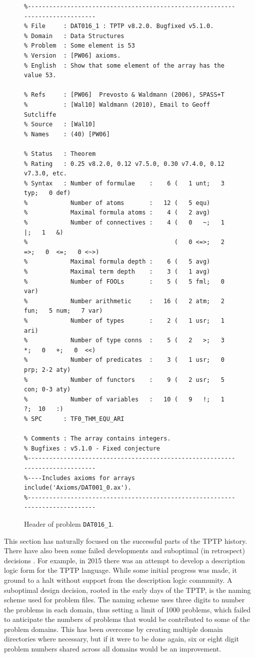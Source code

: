\documentclass{easychair}
\begin{document}
\begin{figure}[htb]
{\footnotesize
{\setlength{\baselineskip}{3mm}
\begin{verbatim}
%------------------------------------------------------------------------------
% File     : DAT016_1 : TPTP v8.2.0. Bugfixed v5.1.0.
% Domain   : Data Structures
% Problem  : Some element is 53
% Version  : [PW06] axioms.
% English  : Show that some element of the array has the value 53.

% Refs     : [PW06]  Prevosto & Waldmann (2006), SPASS+T
%          : [Wal10] Waldmann (2010), Email to Geoff Sutcliffe
% Source   : [Wal10]
% Names    : (40) [PW06]

% Status   : Theorem
% Rating   : 0.25 v8.2.0, 0.12 v7.5.0, 0.30 v7.4.0, 0.12 v7.3.0, etc.
% Syntax   : Number of formulae    :    6 (   1 unt;   3 typ;   0 def)
%            Number of atoms       :   12 (   5 equ)
%            Maximal formula atoms :    4 (   2 avg)
%            Number of connectives :    4 (   0   ~;   1   |;   1   &)
%                                         (   0 <=>;   2  =>;   0  <=;   0 <~>)
%            Maximal formula depth :    6 (   5 avg)
%            Maximal term depth    :    3 (   1 avg)
%            Number of FOOLs       :    5 (   5 fml;   0 var)
%            Number arithmetic     :   16 (   2 atm;   2 fun;   5 num;   7 var)
%            Number of types       :    2 (   1 usr;   1 ari)
%            Number of type conns  :    5 (   2   >;   3   *;   0   +;   0  <<)
%            Number of predicates  :    3 (   1 usr;   0 prp; 2-2 aty)
%            Number of functors    :    9 (   2 usr;   5 con; 0-3 aty)
%            Number of variables   :   10 (   9   !;   1   ?;  10   :)
% SPC      : TF0_THM_EQU_ARI

% Comments : The array contains integers.
% Bugfixes : v5.1.0 - Fixed conjecture
%------------------------------------------------------------------------------
%----Includes axioms for arrays
include('Axioms/DAT001_0.ax').
%------------------------------------------------------------------------------
\end{verbatim}
}}
\caption{Header of problem {\tt DAT016\_1}.}
\label{ExampleHeader}
\end{figure}

This section has naturally focused on the successful parts of the TPTP history.
There have also been some failed developments and suboptimal (in retrospect) decisions \frownie{}.
For example, in 2015 there was an attempt to develop a description logic form for the TPTP 
language. 
While some initial progress was made, it ground to a halt without support from the description 
logic community.
A suboptimal design decision, rooted in the early days of the TPTP, is the naming scheme used for 
problem files. 
The naming scheme uses three digits to number the problems in each domain, thus setting a limit 
of 1000 problems, which failed to anticipate the numbers of problems that would be contributed 
to some of the problem domains.
This has been overcome by creating multiple domain directories where necessary, but if it were 
to be done again, six or eight digit problem numbers shared across all domains would be an 
improvement.
\end{document}
